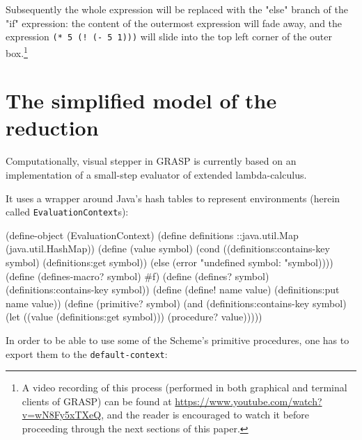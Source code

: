 \documentclass[acmsmall]{acmart}
\newenvironment{Snippet}{\Verbatim[samepage=true]}{\endVerbatim}
\begin{document}
Subsequently the whole expression will be replaced with the "else"
branch of the "if" expression: the content of the outermost expression
will fade away, and the expression \texttt{(* 5 (! (- 5 1)))} will
slide into the top left corner of the outer box.\footnote{A video
recording of this process (performed in both graphical and terminal
clients of GRASP) can be found at
\url{https://www.youtube.com/watch?v=wN8Fy5xTXeQ}, and the reader is
encouraged to watch it before proceeding through the next sections of
this paper.}

\section{The simplified model of the reduction}

Computationally, visual stepper in GRASP is currently based on an
implementation of a small-step evaluator of extended lambda-calculus.

It uses a wrapper around Java's hash tables to represent
environments (herein called \texttt{EvaluationContext}s):

\begin{Snippet}
(define-object (EvaluationContext)
\end{Snippet}
\begin{Snippet}
  (define definitions ::java.util.Map
    (java.util.HashMap))
\end{Snippet}
\begin{Snippet}
  (define (value symbol)
    (cond ((definitions:contains-key symbol)
	   (definitions:get symbol))
	  (else
	   (error "undefined symbol: "symbol))))
\end{Snippet}
\begin{Snippet}
  (define (defines-macro? symbol)
    #f)
\end{Snippet}
\begin{Snippet}
  (define (defines? symbol)
    (definitions:contains-key symbol))
\end{Snippet}
\begin{Snippet}
  (define (define! name value)
    (definitions:put name value))
\end{Snippet}
\begin{Snippet}
  (define (primitive? symbol)
    (and (definitions:contains-key symbol)
	 (let ((value (definitions:get symbol)))
	   (procedure? value)))))
\end{Snippet}

In order to be able to use some of the Scheme's primitive
procedures, one has to export them to the \texttt{default-context}:
\end{document}
